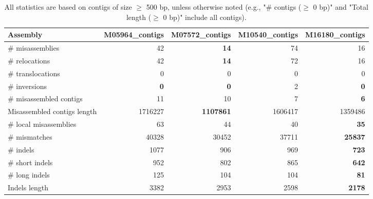 \documentclass[12pt,a4paper]{article}
\begin{document}
\begin{table}[ht]
\begin{center}
\caption{All statistics are based on contigs of size $\geq$ 500 bp, unless otherwise noted (e.g., "\# contigs ($\geq$ 0 bp)" and "Total length ($\geq$ 0 bp)" include all contigs).}
\begin{tabular}{|l*{4}{|r}|}
\hline
Assembly & M05964\_contigs & M07572\_contigs & M10540\_contigs & M16180\_contigs \\ \hline
\# misassemblies & 42 & {\bf 14} & 74 & 16 \\ \hline
\hspace{5mm}\# relocations & 42 & {\bf 14} & 72 & 16 \\ \hline
\hspace{5mm}\# translocations & 0 & 0 & 0 & 0 \\ \hline
\hspace{5mm}\# inversions & {\bf 0} & {\bf 0} & 2 & {\bf 0} \\ \hline
\# misassembled contigs & 11 & 10 & 7 & {\bf 6} \\ \hline
Misassembled contigs length & 1716227 & {\bf 1107861} & 1606417 & 1359486 \\ \hline
\# local misassemblies & 63 & 44 & 40 & {\bf 35} \\ \hline
\# mismatches & 40328 & 30452 & 37711 & {\bf 25837} \\ \hline
\# indels & 1077 & 906 & 969 & {\bf 723} \\ \hline
\hspace{5mm}\# short indels & 952 & 802 & 865 & {\bf 642} \\ \hline
\hspace{5mm}\# long indels & 125 & 104 & 104 & {\bf 81} \\ \hline
Indels length & 3382 & 2953 & 2598 & {\bf 2178} \\ \hline
\end{tabular}
\end{center}
\end{table}
\end{document}
